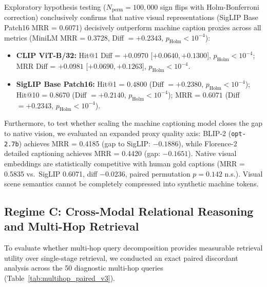 \documentclass[conference]{IEEEtran}
\begin{document}
Exploratory hypothesis testing ($N_{\text{perm}}=100{,}000$ sign flips with Holm-Bonferroni correction) conclusively confirms that native visual representations (SigLIP Base Patch16 MRR = 0.6071) decisively outperform machine caption proxies across all metrics (MiniLM MRR = 0.3728, Diff $= +0.2343$, $p_{\text{Holm}} < 10^{-4}$):
\begin{itemize}
    \setlength{\itemsep}{0.2pt plus 0.1pt}
    \setlength{\parskip}{0pt}
    \item \textbf{CLIP ViT-B/32:} Hit@1 Diff = $+0.0970$ [$+0.0640, +0.1300$], $p_{\text{Holm}} < 10^{-4}$; MRR Diff = $+0.0981$ [$+0.0690, +0.1263$], $p_{\text{Holm}} < 10^{-4}$.
    \item \textbf{SigLIP Base Patch16:} Hit@1 = $0.4800$ (Diff $= +0.2380$, $p_{\text{Holm}} < 10^{-4}$); Hit@10 = $0.8670$ (Diff $= +0.2140$, $p_{\text{Holm}} < 10^{-4}$); MRR = $0.6071$ (Diff $= +0.2343$, $p_{\text{Holm}} < 10^{-4}$).
\end{itemize}

Furthermore, to test whether scaling the machine captioning model closes the gap to native vision, we evaluated an expanded proxy quality axis: BLIP-2 (\texttt{opt-2.7b}) \cite{li2023blip2} achieves MRR = 0.4185 (gap to SigLIP: $-0.1886$), while Florence-2 detailed captioning \cite{xiao2024florence2} achieves MRR = 0.4420 (gap: $-0.1651$). Native visual embeddings are statistically competitive with human gold captions (MRR = 0.5835 vs.\ SigLIP 0.6071, diff $-0.0236$, paired permutation $p = 0.142$ n.s.). Visual scene semantics cannot be completely compressed into synthetic machine tokens.

\subsection{Regime C: Cross-Modal Relational Reasoning and Multi-Hop Retrieval}
\label{sec:regime_c_multihop}
\label{sec:multihop_eval}

To evaluate whether multi-hop query decomposition provides measurable retrieval utility over single-stage retrieval, we conducted an exact paired discordant analysis across the 50 diagnostic multi-hop queries (Table~\ref{tab:multihop_paired_v3}).
\end{document}
